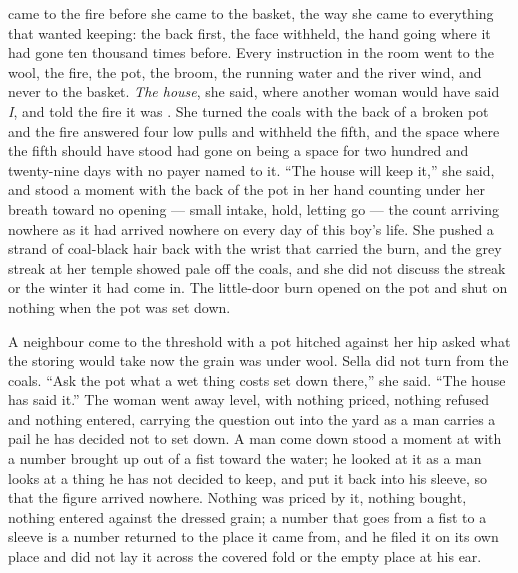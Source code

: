  came to the fire before she came to the basket, the way she came to everything that wanted keeping: the back first, the face withheld, the hand going where it had gone ten thousand times before. Every instruction in the room went to the wool, the fire, the pot, the broom, the running water and the river wind, and never to the basket. \emph{The house}, she said, where another woman would have said \emph{I}, and told the fire it was . She turned the coals with the back of a broken pot and the fire answered four low pulls and withheld the fifth, and the space where the fifth should have stood had gone on being a space for two hundred and twenty-nine days with no payer named to it. “The house will keep it,” she said, and stood a moment with the back of the pot in her hand counting under her breath toward no opening --- small intake, hold, letting go --- the count arriving nowhere as it had arrived nowhere on every day of this boy's life. She pushed a strand of coal-black hair back with the wrist that carried the burn, and the grey streak at her temple showed pale off the coals, and she did not discuss the streak or the winter it had come in. The little-door burn opened on the pot and shut on nothing when the pot was set down.

A neighbour come to the threshold with a pot hitched against her hip asked what the storing would take now the grain was under wool. Sella did not turn from the coals. “Ask the pot what a wet thing costs set down there,” she said. “The house has said it.” The woman went away level, with nothing priced, nothing refused and nothing entered, carrying the question out into the yard as a man carries a pail he has decided not to set down. A man come down  stood a moment at  with a number brought up out of a fist toward the water; he looked at it as a man looks at a thing he has not decided to keep, and put it back into his sleeve, so that the figure arrived nowhere. Nothing was priced by it, nothing bought, nothing entered against the dressed grain; a number that goes from a fist to a sleeve is a number returned to the place it came from, and he filed it on its own place and did not lay it across the covered fold or the empty place at his ear.

